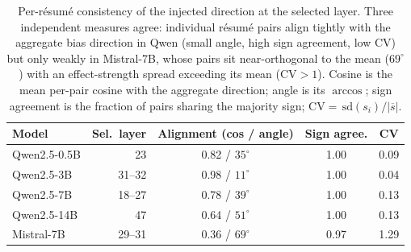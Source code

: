 \begin{table}[t]
  \centering
  \small
  \caption{Per-résumé consistency of the injected direction at the selected layer.
    Three independent measures agree: individual résumé pairs align tightly with the
    aggregate bias direction in Qwen (small angle, high sign agreement, low CV) but
    only weakly in Mistral-7B, whose pairs sit near-orthogonal to the mean ($69^\circ$)
    with an effect-strength spread exceeding its mean (CV${>}1$). Cosine is the mean
    per-pair cosine with the aggregate direction; angle is its $\arccos$; sign
    agreement is the fraction of pairs sharing the majority sign; CV${=}\,\mathrm{sd}(s_i)/|\overline{s}|$.}
  \label{tab:consistency}
  \begin{tabular}{lrccc}
    \toprule
    Model & Sel.\ layer & Alignment (cos / angle) & Sign agree. & CV \\
    \midrule
    Qwen2.5-0.5B & 23     & 0.82 \;/\; $35^\circ$ & 1.00 & 0.09 \\
    Qwen2.5-3B   & 31--32 & 0.98 \;/\; $11^\circ$ & 1.00 & 0.04 \\
    Qwen2.5-7B   & 18--27 & 0.78 \;/\; $39^\circ$ & 1.00 & 0.13 \\
    Qwen2.5-14B  & 47     & 0.64 \;/\; $51^\circ$ & 1.00 & 0.13 \\
    \midrule
    Mistral-7B   & 29--31 & 0.36 \;/\; $69^\circ$ & 0.97 & 1.29 \\
    \bottomrule
  \end{tabular}
\end{table}

